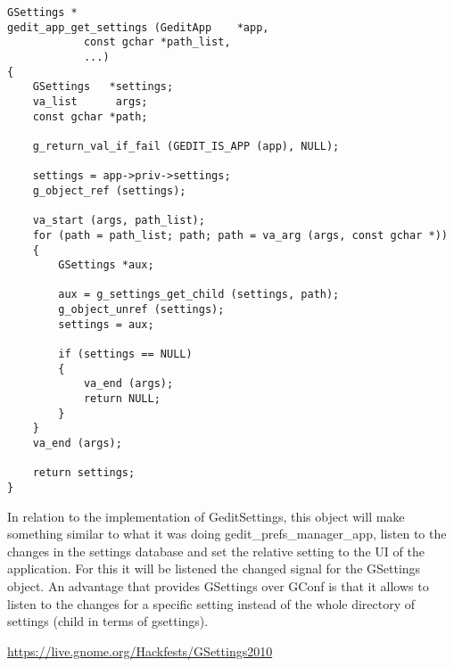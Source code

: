 \begin{lstlisting}[style=GObject]
GSettings *
gedit_app_get_settings (GeditApp    *app,
			const gchar *path_list,
			...)
{
	GSettings   *settings;
	va_list      args;
	const gchar *path;

	g_return_val_if_fail (GEDIT_IS_APP (app), NULL);

	settings = app->priv->settings;
	g_object_ref (settings);

	va_start (args, path_list);
	for (path = path_list; path; path = va_arg (args, const gchar *))
	{
		GSettings *aux;

		aux = g_settings_get_child (settings, path);
		g_object_unref (settings);
		settings = aux;

		if (settings == NULL)
		{
			va_end (args);
			return NULL;
		}
	}
	va_end (args);

	return settings;
}
\end{lstlisting}

In relation to the implementation of GeditSettings, this object will make something similar to what it was doing gedit\_prefs\_manager\_app, listen to the changes in the settings database and set the relative setting to the UI of the application. For this it will be listened the changed signal for the GSettings object. An advantage that provides GSettings over GConf is that it allows to listen to the changes for a specific setting instead of the whole directory of settings (child in terms of gsettings).

\url{https://live.gnome.org/Hackfests/GSettings2010}

